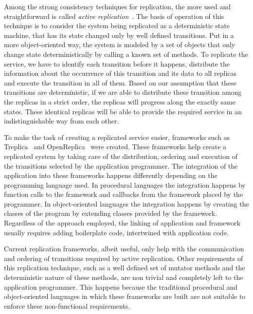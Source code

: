 \documentclass[preprint,review]{elsarticle}
\begin{document}
Among the strong consistency techniques for replication, the more used
and        straightforward        is        called        \emph{active
  replication}~\cite{schneider1990implementing}.     The   basis    of
operation of this technique is to consider the system being replicated
as a deterministic  state machine, that has its state  changed only by
well  defined transitions.   Put in  a more  object-oriented way,  the
system  is  modeled  by  a  set of  objects  that  only  change  state
deterministically by calling a known  set of methods. To replicate the
service,  we  have to  identify  each  transition before  it  happens,
distribute the information about the occurrence of this transition and
its data  to all replicas and  execute the transition in  all of them.
Based on our  assumption that these transitions  are deterministic, if
we are  able to distribute  these transition  among the replicas  in a
strict  order,  the replicas  will  progress  along the  exactly  same
states. These identical replicas will  be able to provide the required
service in an indistinguishable way from each other.

To make the  task of creating a replicated  service easier, frameworks
such   as   Treplica~\cite{vieira08a,  vieira2010implementation}   and
OpenReplica~\cite{altinbuken2012commodifying}  were   created.   These
frameworks  help create  a replicated  system  by taking  care of  the
distribution, ordering  and execution  of the transitions  selected by
the application  programmer. The  integration of the  application into
these  frameworks happens  differently  depending  on the  programming
language  used. In  procedural  languages the  integration happens  by
function  calls to  the  framework and  callbacks  from the  framework
placed by the programmer. In object-oriented languages the integration
happens by  creating the classes  of the program by  extending classes
provided by the  framework.  Regardless of the  approach employed, the
linking  of   application  and   framework  usually   requires  adding
boilerplate code, intertwined with application code.

Current replication frameworks, albeit useful, only help with the
  communication and  ordering  of  transitions required  by
active replication. Other requirements  of this replication technique,
such as  a well defined set  of mutator methods and  the deterministic
nature of  these methods, are non  trivial and completely left  to the
application   programmer.   This   happens  because   the  traditional
procedural and object-oriented languages in which these frameworks are
built   are  not   suitable   to   enforce  these   non-func\-tion\-al
requirements.
\end{document}
